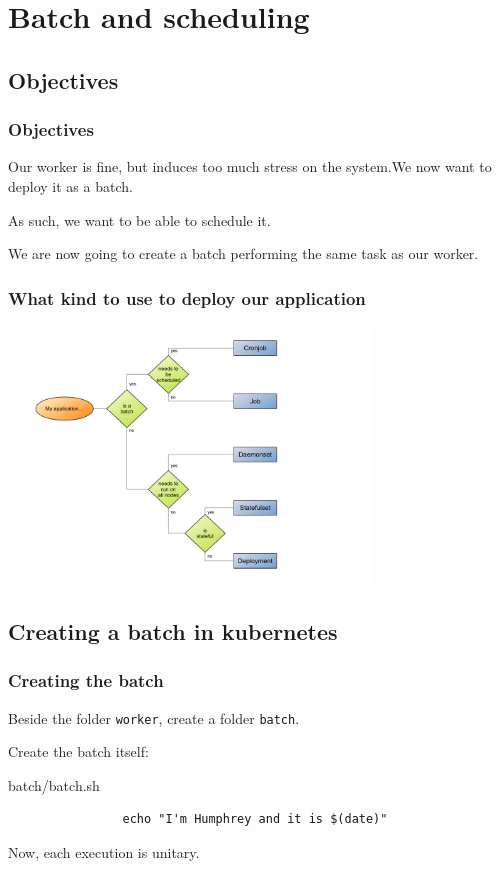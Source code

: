 \section{Batch and scheduling}

\subsection{Objectives}

	\begin{frame}
		\frametitle{Objectives}
		
		Our worker is fine, but induces too much stress on the system.We now want to deploy it as a batch.
		
		\bigskip
		As such, we want to be able to schedule it.
		
		\bigskip
		We are now going to create a batch performing the same task as our worker.
	\end{frame}

	\begin{frame}
		\frametitle{What kind to use to deploy our application}
		
		\begin{center}
		\includegraphics[height=6.8cm]{../../../resources/color/choiceDeploymentType.pdf}
		\end{center}
	\end{frame}
		
\subsection{Creating a batch in kubernetes}		
		
	\begin{frame}[fragile]
		\frametitle{Creating the batch}
		
		Beside the folder \verb!worker!, create a folder \verb!batch!.
		
		\bigskip
		Create the batch itself:
		\begin{block}{batch/batch.sh}
			\begin{verbatim}
				echo "I'm Humphrey and it is $(date)"
			\end{verbatim}
		\end{block}
		Now, each execution is unitary.
	\end{frame}
	
